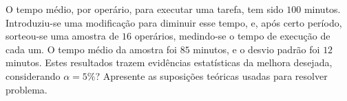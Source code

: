 \documentclass{report}
\begin{document}
\begin{Exercise}
\Question O tempo médio, por operário, para executar uma tarefa, tem sido $100$ minutos. Introduziu-se uma modificação para diminuir esse tempo, e, após certo período, 
sorteou-se uma amostra de $16$ operários, medindo-se o tempo de execução de cada um. O tempo médio da amostra foi $85$ minutos, e o desvio padrão foi $12$ minutos. 
Estes resultados trazem evidências estatísticas da melhora desejada, considerando $\alpha=5\%$? Apresente as suposições teóricas usadas para resolver problema.

    \end{Exercise}
\end{document}
